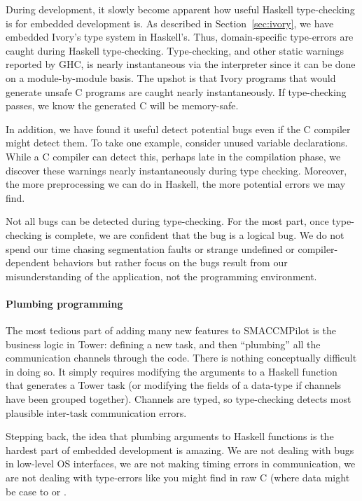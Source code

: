 During development, it slowly become apparent how useful Haskell type-checking
is for embedded development is.  As described in Section~\ref{sec:ivory}, we
have embedded Ivory's type system in Haskell's.  Thus, domain-specific
type-errors are caught during Haskell type-checking.  Type-checking, and other
static warnings reported by GHC, is nearly instantaneous via the interpreter
since it can be done on a module-by-module basis.  The upshot is that Ivory
programs that would generate unsafe C programs are caught nearly
instantaneously.  If type-checking passes, we know the generated C will be
memory-safe.

In addition, we have found it useful detect potential bugs even if the C
compiler might detect them.  To take one example, consider unused variable
declarations.  While a C compiler can detect this, perhaps late in the
compilation phase, we discover these warnings nearly instantaneously during type
checking.  Moreover, the more preprocessing we can do in Haskell, the more
potential errors we may find.

Not all bugs can be detected during type-checking.  For the most part, once
type-checking is complete, we are confident that the bug is a logical bug.  We
do not spend our time chasing segmentation faults or strange undefined or
compiler-dependent behaviors but rather focus on the bugs result from our
misunderstanding of the application, not the programming environment.


\paragraph{Plumbing programming}
The most tedious part of adding many new features to SMACCMPilot is the business
logic in Tower: defining a new task, and then ``plumbing'' all the communication
channels through the code.  There is nothing conceptually difficult in doing so.
It simply requires modifying the arguments to a Haskell function that generates
a Tower task (or modifying the fields of a data-type if channels have been
grouped together).  Channels are typed, so type-checking detects most plausible
inter-task communication errors.

Stepping back, the idea that plumbing arguments to Haskell functions is the
hardest part of embedded development is amazing.  We are not dealing with bugs
in low-level OS interfaces, we are not making timing errors in communication, we
are not dealing with type-errors like you might find in raw C (where data might
be case to  or .

